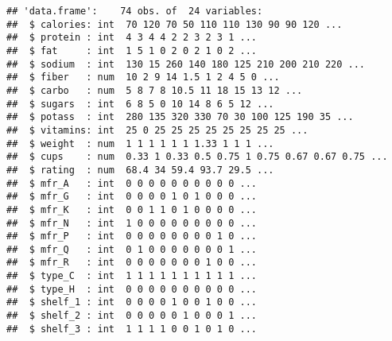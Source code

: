 \documentclass[
]{article}
\newenvironment{Shaded}{\begin{snugshade}}{\end{snugshade}}
\newcommand{\FunctionTok}[1]{\textcolor[rgb]{0.00,0.00,0.00}{#1}}
\newcommand{\NormalTok}[1]{#1}
\newcommand{\OtherTok}[1]{\textcolor[rgb]{0.56,0.35,0.01}{#1}}
\newcommand{\SpecialCharTok}[1]{\textcolor[rgb]{0.00,0.00,0.00}{#1}}
\begin{document}
\begin{verbatim}
## 'data.frame':    74 obs. of  24 variables:
##  $ calories: int  70 120 70 50 110 110 130 90 90 120 ...
##  $ protein : int  4 3 4 4 2 2 3 2 3 1 ...
##  $ fat     : int  1 5 1 0 2 0 2 1 0 2 ...
##  $ sodium  : int  130 15 260 140 180 125 210 200 210 220 ...
##  $ fiber   : num  10 2 9 14 1.5 1 2 4 5 0 ...
##  $ carbo   : num  5 8 7 8 10.5 11 18 15 13 12 ...
##  $ sugars  : int  6 8 5 0 10 14 8 6 5 12 ...
##  $ potass  : int  280 135 320 330 70 30 100 125 190 35 ...
##  $ vitamins: int  25 0 25 25 25 25 25 25 25 25 ...
##  $ weight  : num  1 1 1 1 1 1 1.33 1 1 1 ...
##  $ cups    : num  0.33 1 0.33 0.5 0.75 1 0.75 0.67 0.67 0.75 ...
##  $ rating  : num  68.4 34 59.4 93.7 29.5 ...
##  $ mfr_A   : int  0 0 0 0 0 0 0 0 0 0 ...
##  $ mfr_G   : int  0 0 0 0 1 0 1 0 0 0 ...
##  $ mfr_K   : int  0 0 1 1 0 1 0 0 0 0 ...
##  $ mfr_N   : int  1 0 0 0 0 0 0 0 0 0 ...
##  $ mfr_P   : int  0 0 0 0 0 0 0 0 1 0 ...
##  $ mfr_Q   : int  0 1 0 0 0 0 0 0 0 1 ...
##  $ mfr_R   : int  0 0 0 0 0 0 0 1 0 0 ...
##  $ type_C  : int  1 1 1 1 1 1 1 1 1 1 ...
##  $ type_H  : int  0 0 0 0 0 0 0 0 0 0 ...
##  $ shelf_1 : int  0 0 0 0 1 0 0 1 0 0 ...
##  $ shelf_2 : int  0 0 0 0 0 1 0 0 0 1 ...
##  $ shelf_3 : int  1 1 1 1 0 0 1 0 1 0 ...
\end{verbatim}

\begin{Shaded}
\end{Shaded}
\end{document}
